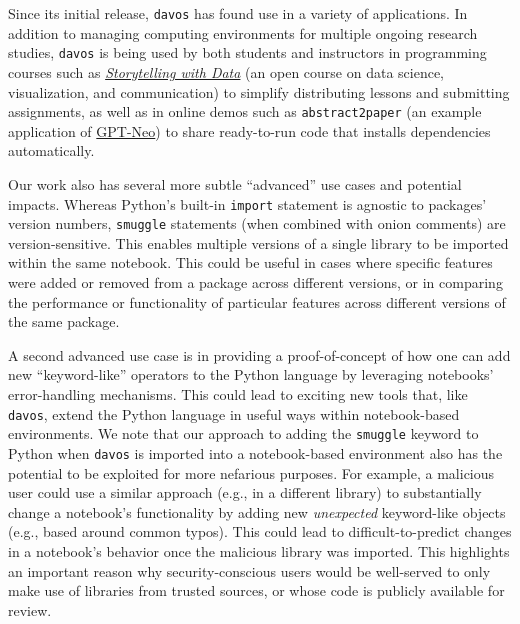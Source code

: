 \documentclass[preprint,12pt,a4paper]{elsarticle}
\begin{document}
Since its initial release, \texttt{davos} has found use in a variety
of applications.  In addition to managing computing environments
for multiple ongoing research studies, \texttt{davos} is being used by
both students and instructors in programming courses such as
\href{https://github.com/ContextLab/storytelling-with-data}{\textit{Storytelling
    with Data}} \cite{Mann21b} (an open course on data science,
visualization, and communication) to simplify distributing lessons and
submitting assignments, as well as in online demos such as
{\texttt{abstract2paper}} \cite{Mann21a} (an example application of
\href{https://github.com/EleutherAI/gpt-neo}{GPT-Neo}) to share
ready-to-run code that installs dependencies automatically.

Our work also has several more subtle ``advanced'' use cases and
potential impacts.  Whereas Python's built-in \texttt{import}
statement is agnostic to packages' version numbers, \texttt{smuggle}
statements (when combined with onion comments) are version-sensitive.
This enables multiple versions of a single library to be
imported within the same notebook.  This could be useful in cases
where specific features were added or removed from a package across
different versions, or in comparing the performance or functionality
of particular features across different versions of the same package.

A second advanced use case is in providing a proof-of-concept of how
one can add new ``keyword-like'' operators to the Python language by
leveraging notebooks' error-handling mechanisms.  This could lead to
exciting new tools that, like \texttt{davos}, extend the Python
language in useful ways within notebook-based environments.  We note that
our approach to adding the \texttt{smuggle} keyword to Python when
\texttt{davos} is imported into a notebook-based environment also has
the potential to be exploited for more nefarious purposes.  For
example, a malicious user could use a similar approach (e.g., in a
different library) to substantially change a notebook's functionality
by adding new \textit{unexpected} keyword-like objects (e.g., based
around common typos).  This could lead to difficult-to-predict changes
in a notebook's behavior once the malicious library was imported.
This highlights an important reason why security-conscious users would
be well-served to only make use of libraries from trusted sources, or
whose code is publicly available for review.

\end{document}

